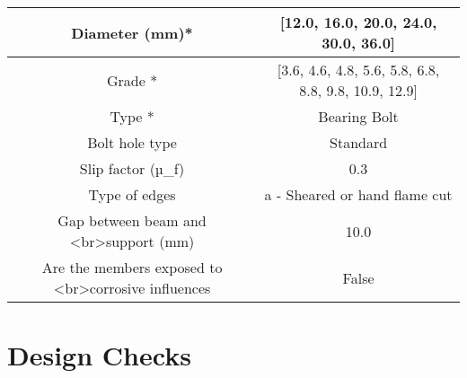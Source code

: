 \documentclass{article}%
\begin{document}
\begin{longtable}{|p{5cm}|p{2cm}|p{2cm}|p{2cm}|p{5cm}|}
\hline%
\hline%
\multicolumn{3}{|c|}{Diameter (mm)*}&\multicolumn{2}{|c|}{{[}12.0, 16.0, 20.0, 24.0, 30.0, 36.0{]}}\\%
\hline%
\hline%
\multicolumn{3}{|c|}{Grade *}&\multicolumn{2}{|c|}{{[}3.6, 4.6, 4.8, 5.6, 5.8, 6.8, 8.8, 9.8, 10.9, 12.9{]}}\\%
\hline%
\hline%
\multicolumn{3}{|c|}{Type *}&\multicolumn{2}{|c|}{Bearing Bolt}\\%
\hline%
\hline%
\multicolumn{3}{|c|}{Bolt hole type}&\multicolumn{2}{|c|}{Standard}\\%
\hline%
\hline%
\multicolumn{3}{|c|}{Slip factor (µ\_f)}&\multicolumn{2}{|c|}{0.3}\\%
\hline%
\hline%
\multicolumn{3}{|c|}{Type of edges}&\multicolumn{2}{|c|}{a {-} Sheared or hand flame cut}\\%
\hline%
\hline%
\multicolumn{3}{|c|}{Gap between beam and <br>support (mm)}&\multicolumn{2}{|c|}{10.0}\\%
\hline%
\hline%
\multicolumn{3}{|c|}{Are the members exposed to <br>corrosive influences}&\multicolumn{2}{|c|}{False}\\%
\hline%
\end{longtable}

%
%
\newpage%
\section{Design Checks}%
\label{sec:DesignChecks}%
\end{document}
